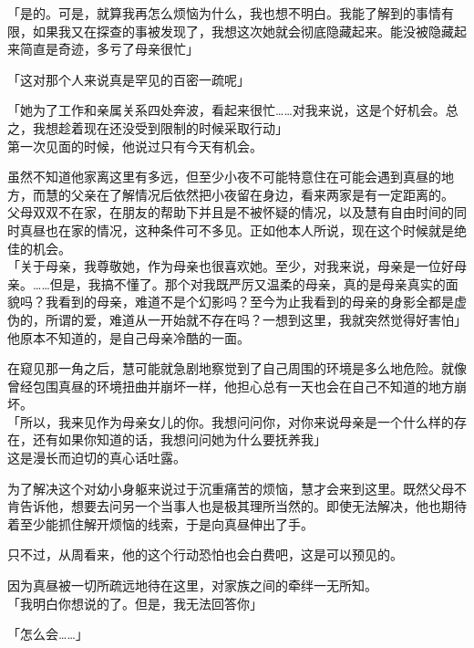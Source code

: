 「是的。可是，就算我再怎么烦恼为什么，我也想不明白。我能了解到的事情有限，如果我又在探查的事被发现了，我想这次她就会彻底隐藏起来。能没被隐藏起来简直是奇迹，多亏了母亲很忙」

「这对那个人来说真是罕见的百密一疏呢」

「她为了工作和亲属关系四处奔波，看起来很忙……对我来说，这是个好机会。总之，我想趁着现在还没受到限制的时候采取行动」\\

第一次见面的时候，他说过只有今天有机会。

虽然不知道他家离这里有多远，但至少小夜不可能特意住在可能会遇到真昼的地方，而慧的父亲在了解情况后依然把小夜留在身边，看来两家是有一定距离的。\\

父母双双不在家，在朋友的帮助下并且是不被怀疑的情况，以及慧有自由时间的同时真昼也在家的情况，这种条件可不多见。正如他本人所说，现在这个时候就是绝佳的机会。\\

「关于母亲，我尊敬她，作为母亲也很喜欢她。至少，对我来说，母亲是一位好母亲。……但是，我搞不懂了。那个对我既严厉又温柔的母亲，真的是母亲真实的面貌吗？我看到的母亲，难道不是个幻影吗？至今为止我看到的母亲的身影全都是虚伪的，所谓的爱，难道从一开始就不存在吗？一想到这里，我就突然觉得好害怕」\\

他原本不知道的，是自己母亲冷酷的一面。

在窥见那一角之后，慧可能就急剧地察觉到了自己周围的环境是多么地危险。就像曾经包围真昼的环境扭曲并崩坏一样，他担心总有一天也会在自己不知道的地方崩坏。\\

「所以，我来见作为母亲女儿的你。我想问问你，对你来说母亲是一个什么样的存在，还有如果你知道的话，我想问问她为什么要抚养我」\\

这是漫长而迫切的真心话吐露。

为了解决这个对幼小身躯来说过于沉重痛苦的烦恼，慧才会来到这里。既然父母不肯告诉他，想要去问另一个当事人也是极其理所当然的。即使无法解决，他也期待着至少能抓住解开烦恼的线索，于是向真昼伸出了手。

只不过，从周看来，他的这个行动恐怕也会白费吧，这是可以预见的。

因为真昼被一切所疏远地待在这里，对家族之间的牵绊一无所知。\\

「我明白你想说的了。但是，我无法回答你」

「怎么会……」

